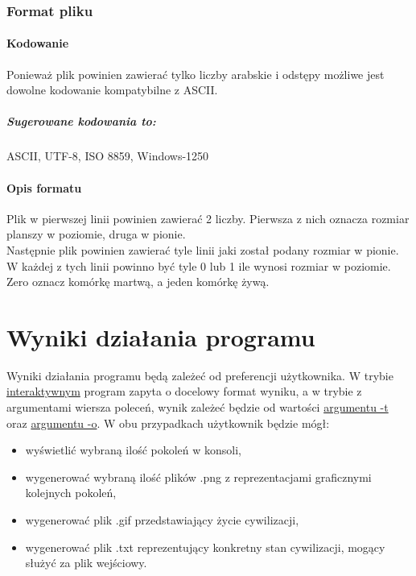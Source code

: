 \documentclass{report}
\begin{document}
\subsection{Format pliku}
\subsubsection*{Kodowanie}
Ponieważ plik powinien zawierać tylko liczby arabskie i odstępy możliwe jest dowolne kodowanie kompatybilne z ASCII. \\
\paragraph{Sugerowane kodowania to:}
ASCII, UTF-8, ISO 8859, Windows-1250

\subsubsection*{Opis formatu}
Plik w pierwszej linii powinien zawierać 2 liczby. Pierwsza z nich oznacza rozmiar planszy w poziomie, druga w pionie. \\
Następnie plik powinien zawierać tyle linii jaki został podany rozmiar w pionie. W każdej z tych linii powinno być tyle 0 lub 1 ile wynosi rozmiar w poziomie. \\
Zero oznacz komórkę martwą, a jeden komórkę żywą.

\chapter{Wyniki działania programu}
Wyniki działania programu będą zależeć od preferencji użytkownika. W trybie \hyperref[interaktywny]{\textcolor{LinkColor}{interaktywnym}} program zapyta o docelowy format wyniku, a w trybie z argumentami wiersza poleceń, wynik zależeć będzie od wartości  \hyperref[output_args]{\textcolor{LinkColor}{argumentu -t}} oraz \hyperref[output_dest]{\textcolor{LinkColor}{argumentu -o}}. W obu przypadkach użytkownik będzie mógł:
\begin{itemize}
\item wyświetlić wybraną ilość pokoleń w konsoli,
\item wygenerować wybraną ilość plików .png z reprezentacjami graficznymi kolejnych pokoleń,
\item wygenerować plik .gif przedstawiający życie cywilizacji,
\item wygenerować plik .txt reprezentujący konkretny stan cywilizacji, mogący służyć za plik wejściowy.
\end{itemize}
\end{document}
